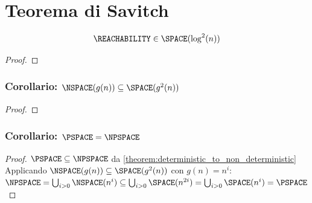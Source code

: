 \section{Teorema di Savitch}
\[
\REACHABILITY \in \SPACE(\log^2(n))
\]

\begin{proof}

\end{proof}

\subsubsection{Corollario: $\NSPACE(g(n)) \subseteq \SPACE(g^2(n))$}
\begin{proof}
\end{proof}

\subsubsection{Corollario: $\PSPACE = \NPSPACE$}
\begin{proof}
$\PSPACE \subseteq \NPSPACE$ da \ref{theorem:deterministic_to_non_deterministic} \\
Applicando $\NSPACE(g(n)) \subseteq \SPACE(g^2(n))$ con $g(n) = n^i$: \\
$\NPSPACE = \bigcup_{i>0} \NSPACE(n^i) \subseteq \bigcup_{i>0} \SPACE(n^{2i}) = \bigcup_{i>0} \SPACE(n^i) = \PSPACE$
\end{proof}